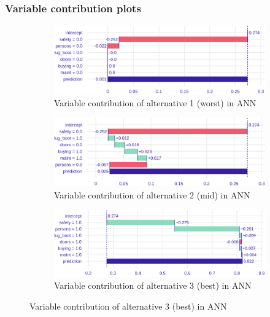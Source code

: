 \documentclass[../main.tex]{subfiles}
\begin{document}
\subsubsection{Variable contribution plots}
\begin{figure}[H]
    \centering
    \begin{subfigure}{\linewidth}
        \includegraphics[width=\linewidth]{../img/ANN-breakdown-worst.png}
        \caption{Variable contribution of alternative 1 (worst) in ANN}
        \label{fig:ANN-3alt1-contrib}
    \end{subfigure}
    \begin{subfigure}{\linewidth}
        \includegraphics[width=\linewidth]{../img/ANN-breakdown-mid.png}
        \caption{Variable contribution of alternative 2 (mid) in ANN}
        \label{fig:ANN-3alt2-contrib}
    \end{subfigure}
    \begin{subfigure}{\linewidth}
        \includegraphics[width=\linewidth]{../img/ANN-breakdown-best.png}
        \caption{Variable contribution of alternative 3 (best) in ANN}
        \label{fig:ANN-3alt3-contrib}
    \end{subfigure}
\end{figure}
\end{document}
